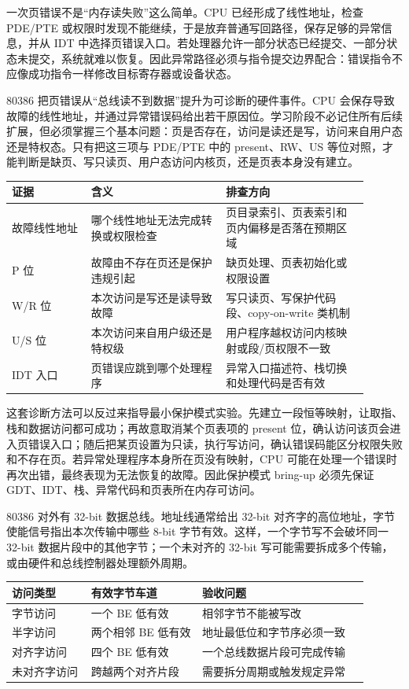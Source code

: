 一次页错误不是“内存读失败”这么简单。CPU 已经形成了线性地址，检查 PDE/PTE 或权限时发现不能继续，于是放弃普通写回路径，保存足够的异常信息，并从 IDT 中选择页错误入口。若处理器允许一部分状态已经提交、一部分状态未提交，系统就难以恢复。因此异常路径必须与指令提交边界配合：错误指令不应像成功指令一样修改目标寄存器或设备状态。

80386 把页错误从“总线读不到数据”提升为可诊断的硬件事件。CPU 会保存导致故障的线性地址，并通过异常错误码给出若干原因位。学习阶段不必记住所有后续扩展，但必须掌握三个基本问题：页是否存在，访问是读还是写，访问来自用户态还是特权态。只有把这三项与 PDE/PTE 中的 present、RW、US 等位对照，才能判断是缺页、写只读页、用户态访问内核页，还是页表本身没有建立。

\begin{longtable}{L{0.2\linewidth}L{0.34\linewidth}L{0.36\linewidth}}
\toprule
证据 & 含义 & 排查方向 \\
\midrule
故障线性地址 & 哪个线性地址无法完成转换或权限检查 & 页目录索引、页表索引和页内偏移是否落在预期区域 \\
P 位 & 故障由不存在页还是保护违规引起 & 缺页处理、页表初始化或权限设置 \\
W/R 位 & 本次访问是写还是读导致故障 & 写只读页、写保护代码段、copy-on-write 类机制 \\
U/S 位 & 本次访问来自用户级还是特权级 & 用户程序越权访问内核映射或段/页权限不一致 \\
IDT 入口 & 页错误应跳到哪个处理程序 & 异常入口描述符、栈切换和处理代码是否有效 \\
\bottomrule
\end{longtable}

这套诊断方法可以反过来指导最小保护模式实验。先建立一段恒等映射，让取指、栈和数据访问都可成功；再故意取消某个页表项的 present 位，确认访问该页会进入页错误入口；随后把某页设置为只读，执行写访问，确认错误码能区分权限失败和不存在页。若异常处理程序本身所在页没有映射，CPU 可能在处理一个错误时再次出错，最终表现为无法恢复的故障。因此保护模式 bring-up 必须先保证 GDT、IDT、栈、异常代码和页表所在内存可访问。

80386 对外有 32-bit 数据总线。地址线通常给出 32-bit 对齐字的高位地址，字节使能信号指出本次传输中哪些 8-bit 字节有效。这样，一个字节写不会破坏同一 32-bit 数据片段中的其他字节；一个未对齐的 32-bit 写可能需要拆成多个传输，或由硬件和总线控制器处理额外周期。

\begin{longtable}{L{0.2\linewidth}L{0.28\linewidth}L{0.42\linewidth}}
\toprule
访问类型 & 有效字节车道 & 验收问题 \\
\midrule
字节访问 & 一个 BE 低有效 & 相邻字节不能被写改 \\
半字访问 & 两个相邻 BE 低有效 & 地址最低位和字节序必须一致 \\
对齐字访问 & 四个 BE 低有效 & 一个总线数据片段可完成传输 \\
未对齐字访问 & 跨越两个对齐片段 & 需要拆分周期或触发规定异常 \\
\bottomrule
\end{longtable}

